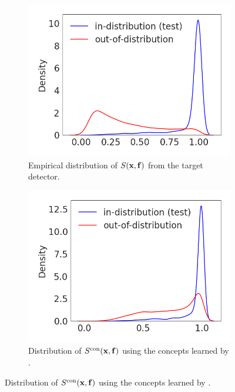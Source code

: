 \begin{figure}[t]
  \centering
  \begin{subfigure}{0.32\linewidth}
    \includegraphics[width=\textwidth]{figures/distr_msp_target.png}
    \caption{\small Empirical distribution of $S(\mathbf{x}, \mathbf{f})$ from the target detector.}
    \label{fig:short-a}
  \end{subfigure}
  \hfill
  \begin{subfigure}{0.32\linewidth}
    \includegraphics[width=\textwidth]{figures/distr_msp_yeh.png}
    \caption{\small Distribution of $S^{\textrm{con}}(\mathbf{x}, \mathbf{f})$ using the concepts learned by \citet{yeh2020completeness}.}
    \label{fig:short-b}
  \end{subfigure}

\end{figure}
